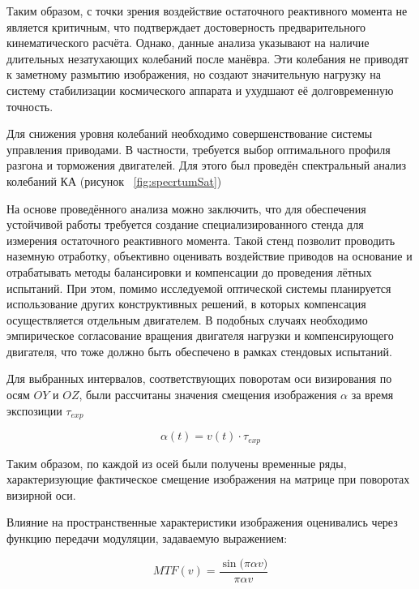 Таким образом, с точки зрения \blur воздействие остаточного реактивного момента не является критичным, что подтверждает достоверность предварительного кинематического расчёта. Однако, данные анализа указывают на наличие длительных незатухающих колебаний после манёвра. Эти колебания не приводят к заметному размытию изображения, но создают значительную нагрузку на систему стабилизации космического аппарата и ухудшают её долговременную точность. 

Для снижения уровня колебаний необходимо совершенствование системы управления приводами. В частности, требуется выбор оптимального профиля разгона и торможения двигателей. Для этого был проведён спектральный анализ колебаний КА (рисунок ~\cref{fig:specrtumSat})


На основе проведённого анализа можно заключить, что для обеспечения устойчивой работы требуется создание специализированного стенда для измерения остаточного реактивного момента. Такой стенд позволит проводить наземную отработку, объективно оценивать воздействие приводов на основание и отрабатывать методы балансировки и компенсации до проведения лётных испытаний. При этом, помимо исследуемой оптической системы планируется использование других конструктивных решений, в которых компенсация осуществляется отдельным двигателем. В подобных случаях необходимо эмпирическое согласование вращения двигателя нагрузки и компенсирующего двигателя, что тоже должно быть обеспечено в рамках стендовых испытаний.

Для выбранных интервалов, соответствующих поворотам оси визирования по осям $OY$ и $OZ$, были рассчитаны значения смещения изображения $\alpha$ за время экспозиции $\tau_{exp}$ 

\begin{equation}
	\alpha(t)=v(t)\cdot \tau_{exp}
\end{equation}

Таким образом, по каждой из осей были получены временные ряды, характеризующие фактическое смещение изображения на матрице при поворотах визирной оси.


Влияние \blur{} на пространственные характеристики изображения оценивались через функцию передачи модуляции, задаваемую выражением:

\begin{equation}
	MTF(v) = \frac{\sin\!\bigl(\pi \alpha v\bigr)}{\pi \alpha v}
\end{equation}

